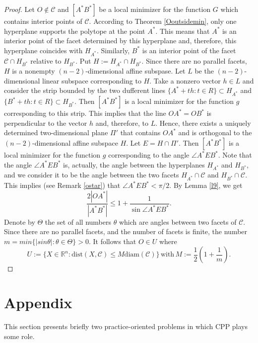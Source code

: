 \documentclass[a4paper,12pt]{amsart}
\begin{document}
\begin{proof}
Let $O \not \in \mathcal C$ and $[A^*B^*]$ be a local minimizer for the function $G$ which contains interior points of $\mathcal C$.
According to Theorem \ref{Ooutsidemin}, only one hyperplane supports the polytope at the point $A^*$. This means that
$A^*$ is an
interior point of the facet determined by this hyperplane and, therefore, this hyperplane coincides with $H_{A^*}$.
Similarly,  $B^*$ is an
interior point of the facet $\mathcal C \cap H_{B^*}$ relative to $H_{B^*}$.
Put $H:= H_{A^*} \cap H_{B^*}$. Since there are no parallel facets, $H$ is a nonempty $(n-2)$-dimensional affine subspase. Let $L$ be the $(n-2)$-dimensional linear subspace corresponding to $H$.
Take a nonzero vector $h \in L$ and consider the strip
bounded by the two dufferent lines $\{A^* + t h : t \in R\} \subset H_{A^*}$
and $\{B^* + t h : t \in R\} \subset H_{B^*}$. Then
$[A^*B^*]$ is a local minimizer for the function $g$ corresponding to this strip. This implies that the line $OA^* = OB^*$ is perpendicular to the vector $h$ and, therefore, to $L$.
Hence, there exists a uniquely determined two-dimensional plane $\Pi'$
that contains $OA^*$ and is orthogonal to the
$(n-2)$-dimensional affine subspace $H$.
Let $E= H \cap \Pi'$. Then $[A^*B^*]$ is a local minimizer for the function $g$
corresponding to the angle $\angle A^*EB^*$.
Note that the angle $\angle A^*EB^*$ is, actually, the angle between the hyperplanes $H_{A^*}$ and $H_{B^*}$, and we consider it to be the angle between the two facets $H_{A^*}\cap \mathcal C$ and $H_{B^*}\cap \mathcal C$.
This implies (see Remark \ref{ostar}) that $\angle A^*EB^* <\pi/2$.
By Lemma \ref{l9}, we get
$$\frac{2|OA^*|}{|A^*B^*|}\le 1+\frac{1}{\sin \angle  A^* E B^*}.$$
 Denote by $\Theta$ the set of all numbers $\theta$ which are angles between two facets of $\mathcal C$.
 Since there are no parallel facets, and the number of facets is finite, the number
 $m= min\{|sin \theta|: \theta \in \Theta\} >0$. It follows that $O \in U$ where
$$U :=\{X\in\mathbb R^n: \text{dist}(X,
\mathcal C)\le M\text{diam}(\mathcal C)\}\, \text{with}\, M:=\frac{1}{2}\left(1+\frac{1}{m}\right).$$

\end{proof}



\section{Appendix}
This section presents briefly two practice-oriented problems in which CPP plays some role.
\end{document}
